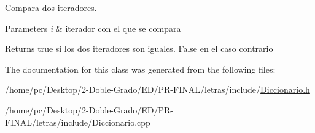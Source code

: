 Compara dos iteradores. 


\begin{DoxyParams}{Parameters}
{\em i} & iterador con el que se compara \\
\hline
\end{DoxyParams}
\begin{DoxyReturn}{Returns}
true si los dos iteradores son iguales. False en el caso contrario 
\end{DoxyReturn}


The documentation for this class was generated from the following files\-:\begin{DoxyCompactItemize}
\item 
/home/pc/\-Desktop/2-\/\-Doble-\/\-Grado/\-E\-D/\-P\-R-\/\-F\-I\-N\-A\-L/letras/include/\hyperlink{Diccionario_8h}{Diccionario.\-h}\item 
/home/pc/\-Desktop/2-\/\-Doble-\/\-Grado/\-E\-D/\-P\-R-\/\-F\-I\-N\-A\-L/letras/include/Diccionario.\-cpp\end{DoxyCompactItemize}
